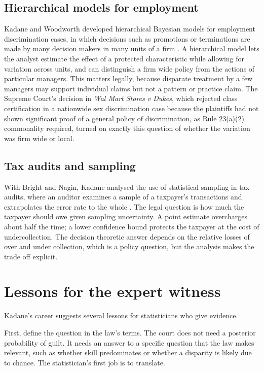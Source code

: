\subsection{Hierarchical models for employment}

Kadane and Woodworth developed hierarchical Bayesian models for employment discrimination cases, in which decisions such as promotions or terminations are made by many decision makers in many units of a firm \citep{kadane2004}. A hierarchical model lets the analyst estimate the effect of a protected characteristic while allowing for variation across units, and can distinguish a firm wide policy from the actions of particular managers. This matters legally, because disparate treatment by a few managers may support individual claims but not a pattern or practice claim. The Supreme Court's decision in \emph{Wal Mart Stores v Dukes}, which rejected class certification in a nationwide sex discrimination case because the plaintiffs had not shown significant proof of a general policy of discrimination, as Rule 23(a)(2) commonality required, turned on exactly this question of whether the variation was firm wide or local.

\subsection{Tax audits and sampling}

With Bright and Nagin, Kadane analysed the use of statistical sampling in tax audits, where an auditor examines a sample of a taxpayer's transactions and extrapolates the error rate to the whole \citep{bright1988}. The legal question is how much the taxpayer should owe given sampling uncertainty. A point estimate overcharges about half the time; a lower confidence bound protects the taxpayer at the cost of undercollection. The decision theoretic answer depends on the relative losses of over and under collection, which is a policy question, but the analysis makes the trade off explicit.

\section{Lessons for the expert witness}

Kadane's career suggests several lessons for statisticians who give evidence.

First, define the question in the law's terms. The court does not need a posterior probability of guilt. It needs an answer to a specific question that the law makes relevant, such as whether skill predominates or whether a disparity is likely due to chance. The statistician's first job is to translate.

